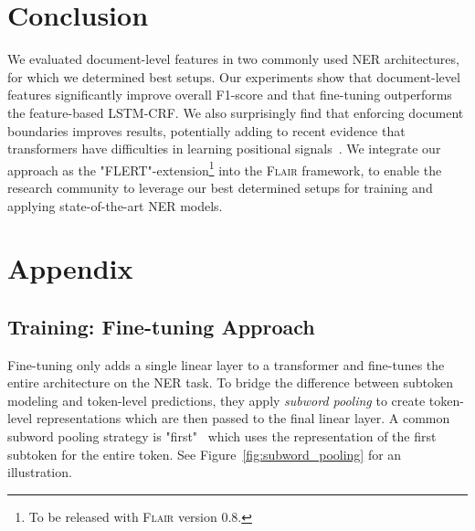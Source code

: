 \documentclass[11pt,a4paper]{article}
\begin{document}
\vspace{-1mm}
\section{Conclusion}
\vspace{-1mm}

We evaluated document-level features in two commonly used NER architectures, for which we determined best setups. Our experiments show that document-level features significantly improve overall F1-score and that fine-tuning outperforms the feature-based LSTM-CRF. We also surprisingly find that enforcing document boundaries improves results, potentially adding to recent evidence that transformers have difficulties in learning positional signals~\cite{huang-etal-2020-improve}. We integrate our approach as the "FLERT"-extension\footnote{To be released with \textsc{Flair} version 0.8.} into the \textsc{Flair} framework, to enable the research community to leverage our best determined setups for training and applying state-of-the-art NER models. 




















\newpage
\appendix
\clearpage
\newpage
\section{Appendix}

\subsection{Training: Fine-tuning Approach}

Fine-tuning only adds a single linear layer to a transformer and fine-tunes the entire architecture on the NER task. To bridge the difference between subtoken modeling and token-level predictions, they apply \textit{subword pooling} to create token-level representations which are then passed to the final linear layer. A common subword pooling strategy is "first"~\cite{devlin-etal-2019-bert} which uses the representation of the first subtoken for the entire token. See Figure~\ref{fig:subword_pooling} for an illustration. 
\end{document}
